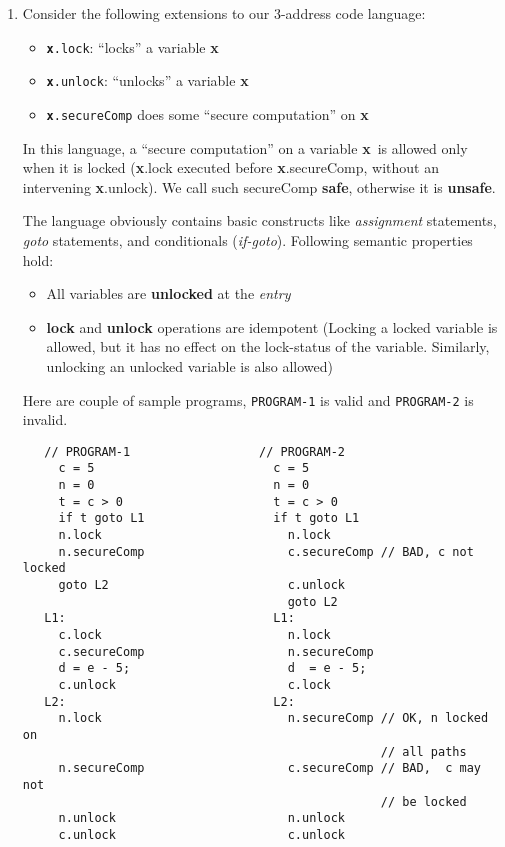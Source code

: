 \documentclass[12pt]{article}
\begin{document}
\begin{enumerate}
You jobs  is to either {\bf  prove that  Dr Dominoz is  right} or
show that  he is {\bf  wrong, by  giving a counter  example}. The
proof must work for any  arbitrary CFG, while the counter example
must  show   an  incorrect  SSA   form  being  generated   for  a
CFG.\hfill[10]

\clearpage
\newcommand{\px}{\mbox{\bf x}}
\item Consider the following extensions to our 3-address code
  language:
  \begin{itemize}
  \item {\tt \px.lock}: ``locks'' a variable \px
  \item {\tt \px.unlock}: ``unlocks'' a variable \px
  \item {\tt \px.secureComp} does some ``secure computation'' on \px
  \end{itemize}

  In this language, a ``secure computation'' on a variable \px\
  is allowed only when it is locked (\px.lock executed before
  \px.secureComp, without an intervening \px.unlock). We call
  such secureComp {\bf safe}, otherwise it is {\bf unsafe}.

  The language obviously contains basic constructs like {\em
    assignment} statements, {\em goto} statements, and
  conditionals ({\em if-goto}). Following semantic properties
  hold:
 \begin{itemize}
 \item All variables are {\bf unlocked} at the {\em entry}
 \item  {\bf lock}  and  {\bf unlock}  operations are  idempotent
   (Locking a locked variable is allowed, but it has no effect on
   the  lock-status  of  the  variable.  Similarly,  unlocking  an
   unlocked variable is also allowed)
 \end{itemize}
 Here are couple of sample programs, {\tt PROGRAM-1} is valid and {\tt PROGRAM-2} is invalid.
\begin{verbatim}
   // PROGRAM-1                  // PROGRAM-2
     c = 5                         c = 5 
     n = 0                         n = 0
     t = c > 0                     t = c > 0
     if t goto L1                  if t goto L1
     n.lock                          n.lock   
     n.secureComp                    c.secureComp // BAD, c not locked
     goto L2                         c.unlock  
                                     goto L2
   L1:                             L1:
     c.lock                          n.lock
     c.secureComp                    n.secureComp
     d = e - 5;                      d  = e - 5;
     c.unlock                        c.lock
   L2:                             L2:
     n.lock                          n.secureComp // OK, n locked on
                                                  // all paths
     n.secureComp                    c.secureComp // BAD,  c may not
                                                  // be locked 
     n.unlock                        n.unlock
     c.unlock                        c.unlock
\end{verbatim}


\end{enumerate}
\end{document}
